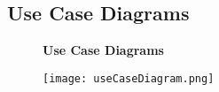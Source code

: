
\subsection{Use Case Diagrams}


\begin{figure}
    \centering
    \textbf{Use Case Diagrams}\par\medskip
    \texttt{[image: useCaseDiagram.png]}
\end{figure}